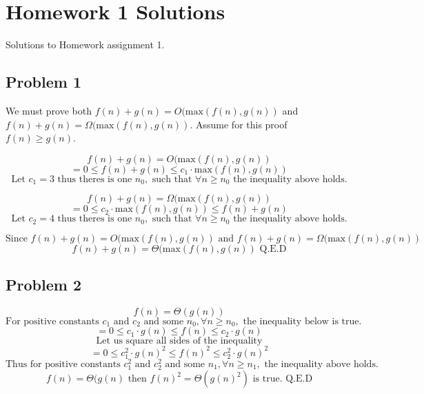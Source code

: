 \documentclass{article}
\begin{document}







\fi
\section{Homework 1 Solutions}

Solutions to Homework assignment 1.

\subsection{Problem 1}

We must prove both $f(n) + g(n) = O(\text{max}(f(n),g(n))$ and $f(n) + g(n) = \Omega(\text{max}(f(n),g(n))$. Assume for this proof $f(n) \ge g(n)$.

$$f(n) + g(n) = O(\text{max}(f(n),g(n))$$
$$= 0 \le f(n) + g(n) \le c_1 \cdot \text{max}(f(n),g(n))$$
$$\text{Let } c_1 = 3 \text{ thus theres is one } n_0, \text{ such that } \forall n \ge n_0 \text{ the inequality above holds.}$$

$$f(n) + g(n) = \Omega(\text{max}(f(n),g(n))$$
$$= 0 \le c_2 \cdot \text{max}(f(n),g(n)) \le f(n) + g(n) $$
$$\text{Let } c_2 = 4 \text{ thus theres is one } n_0, \text{ such that } \forall n \ge n_0 \text{ the inequality above holds.}$$

$$\text{Since } f(n) + g(n) = O(\text{max}(f(n),g(n)) \text{ and } f(n) + g(n) = \Omega(\text{max}(f(n),g(n)) $$
$$f(n) + g(n) = \Theta(\text{max}(f(n),g(n)) \text{ Q.E.D}$$

\subsection{Problem 2}

$$f(n) = \Theta(g(n)) $$
$$\text{For positive constants } c_1 \text{ and } c_2 \text{ and some } n_0, \forall n \ge n_0, \text{ the inequality below is true.}$$
$$= 0 \le c_1 \cdot g(n) \le f(n) \le c_2 \cdot g(n) $$
$$\text{Let us square all sides of the inequality}$$
$$= 0 \le c_1^2 \cdot g(n)^2 \le f(n)^2 \le c_2^2 \cdot g(n)^2 $$
$$\text{Thus for positive constants } c_{1}^2 \text{ and } c_{2}^2 \text{ and some } n_1, \forall n \ge n_1,\text{ the inequality above holds.}$$
$$f(n) = \Theta(g(n) \text{ then } f(n)^2 = \Theta(g(n)^2) \text{ is true. Q.E.D} $$
\end{document}
